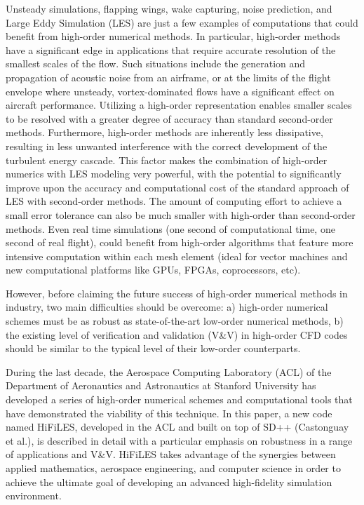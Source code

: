 Unsteady simulations, flapping wings, wake capturing, noise prediction, and Large Eddy Simulation (LES) are just a few examples of computations that could benefit from high-order numerical methods. In particular, high-order methods have a significant edge in applications that require accurate resolution of the smallest scales of the flow. Such situations include the generation and propagation of acoustic noise from an airframe, or at the limits of the flight envelope where unsteady, vortex-dominated flows have a significant effect on aircraft performance. Utilizing a high-order representation enables smaller scales to be resolved with a greater degree of accuracy than standard second-order methods. Furthermore, high-order methods are inherently less dissipative, resulting in less unwanted interference with the correct development of the turbulent energy cascade. This factor makes the combination of high-order numerics with LES modeling very powerful, with the potential to significantly improve upon the accuracy and computational cost of the standard approach of LES with second-order methods. The amount of computing effort to achieve a small error tolerance can also be much smaller with high-order than second-order methods. Even real time simulations (one second of computational time, one second of real flight), could benefit from high-order algorithms that feature more intensive computation within each mesh element (ideal for vector machines and new computational platforms like GPUs, FPGAs, coprocessors, etc).

However, before claiming the future success of high-order numerical methods in industry, two main difficulties should be overcome: a) high-order numerical schemes must be as robust as state-of-the-art low-order numerical methods, b) the existing level of verification and validation (V\&V) in high-order CFD codes should be similar to the typical level of their low-order counterparts.

During the last decade, the Aerospace Computing Laboratory (ACL) of the Department of Aeronautics and Astronautics at Stanford University has developed a series of high-order numerical schemes and computational tools that have demonstrated the viability of this technique. In this paper, a new code named HiFiLES, developed in the ACL and built on top of SD++ (Castonguay et al.\cite{castonguay2011}), is described in detail with a particular emphasis on robustness in a range of applications and V\&V. HiFiLES takes advantage of the synergies between applied mathematics, aerospace engineering, and computer science in order to achieve the ultimate goal of developing an advanced high-fidelity simulation environment.

